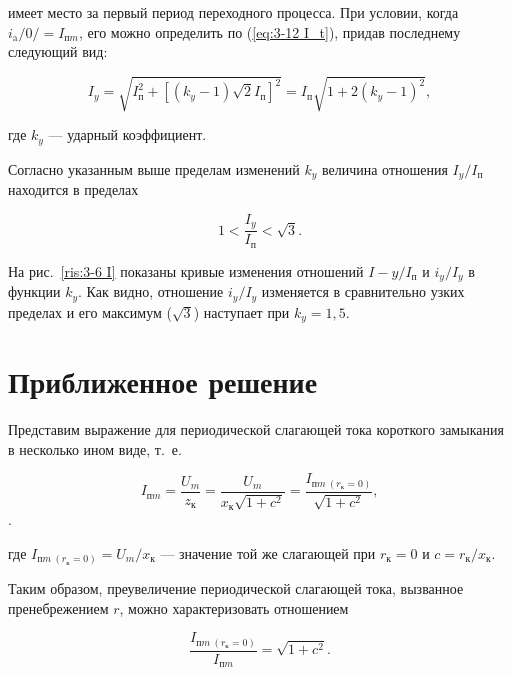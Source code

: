  имеет место за первый период  переходного процесса. При условии, когда $ i_{\text{a}}/0/ = I_{\text{п}m} $, его можно определить по (\ref{eq:3-12 I_t}), придав последнему следующий вид:

\begin{equation}
	I_y = \sqrt{I^2_{\text{п}} + [(k_y - 1) \sqrt{2} I_{\text{п}}]^2} = I_{\text{п}} \sqrt{1 + 2(k_y-1)^2},
	\label{eq:3-13 I_y}
\end{equation}

где $ k_y $ --- ударный коэффициент.

Согласно указанным выше пределам изменений $ k_y $ величина отношения $ I_y / I_{\text{п}} $ находится в пределах

\begin{equation*}
	1 < \frac{I_y}{I_{\text{п}}} < \sqrt{3}.
\end{equation*}

На рис.~\ref{ris:3-6 I} показаны кривые изменения отношений $ I-y / I_{\text{п}} $ и $ i_y / I_y $ в функции $ k_y $. Как видно, отношение $ i_y / I_y $ изменяется в сравнительно узких пределах и его максимум ($ \sqrt{3} $) наступает при $ k_y = 1,5 $.


\section{Приближенное решение}

Представим выражение для периодической слагающей тока короткого замыкания в несколько ином виде, т.~е.

\begin{equation*}
	I_{\text{п}m} = \frac{U_m}{z_{\text{к}}} = \frac{U_m}{x_{\text{к}} \sqrt{1 + c^2}} = \frac{I_{\text{п}m~(r_{\text{к}}=0)}}{\sqrt{1 + c^2}},
\end{equation*}                                                                      .

где $ I_{\text{п}m~(r_{\text{к}}=0)} = U_m / x_{\text{к}} $ --- значение той же слагающей при $ r_{\text{к}} = 0 $ и $ c = r_{\text{к}} / x_{\text{к}} $.

Таким образом, преувеличение периодической слагающей тока, вызванное пренебрежением $ r $, можно характеризовать отношением

\begin{equation}
	\frac{I_{\text{п}m~(r_{\text{к}}=0)}}{I_{\text{п}m}} = \sqrt{1 + c^2}.
	\label{eq:3-14 otn}
\end{equation}

